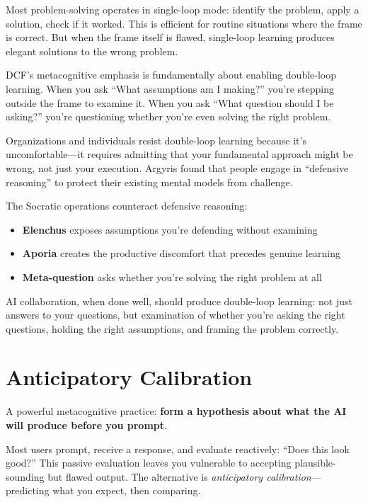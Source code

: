 Most problem-solving operates in single-loop mode: identify the problem, apply a solution, check if it worked. This is efficient for routine situations where the frame is correct. But when the frame itself is flawed, single-loop learning produces elegant solutions to the wrong problem.

DCF's metacognitive emphasis is fundamentally about enabling double-loop learning. When you ask ``What assumptions am I making?'' you're stepping outside the frame to examine it. When you ask ``What question should I be asking?'' you're questioning whether you're even solving the right problem.

Organizations and individuals resist double-loop learning because it's uncomfortable---it requires admitting that your fundamental approach might be wrong, not just your execution. Argyris found that people engage in ``defensive reasoning'' to protect their existing mental models from challenge.

The Socratic operations counteract defensive reasoning:

\begin{itemize}
    \item \textbf{Elenchus} exposes assumptions you're defending without examining
    \item \textbf{Aporia} creates the productive discomfort that precedes genuine learning
    \item \textbf{Meta-question} asks whether you're solving the right problem at all
\end{itemize}

AI collaboration, when done well, should produce double-loop learning: not just answers to your questions, but examination of whether you're asking the right questions, holding the right assumptions, and framing the problem correctly.

\section{Anticipatory Calibration}\label{sec:anticipatory-calibration}

A powerful metacognitive practice: \textbf{form a hypothesis about what the AI will produce before you prompt}.

Most users prompt, receive a response, and evaluate reactively: ``Does this look good?'' This passive evaluation leaves you vulnerable to accepting plausible-sounding but flawed output. The alternative is \emph{anticipatory calibration}---predicting what you expect, then comparing.

